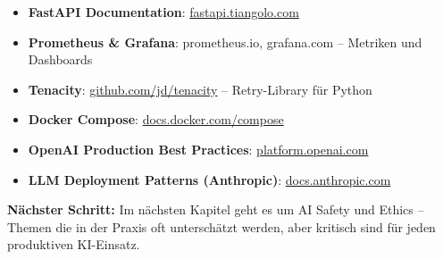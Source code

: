 \begin{itemize}[leftmargin=*]
    \item \textbf{FastAPI Documentation}: \href{https://fastapi.tiangolo.com}{fastapi.tiangolo.com}
    \item \textbf{Prometheus \& Grafana}: prometheus.io, grafana.com -- Metriken und Dashboards
    \item \textbf{Tenacity}: \href{https://github.com/jd/tenacity}{github.com/jd/tenacity} -- Retry-Library für Python
    \item \textbf{Docker Compose}: \href{https://docs.docker.com/compose/}{docs.docker.com/compose}
    \item \textbf{OpenAI Production Best Practices}: \href{https://platform.openai.com/docs/guides/production-best-practices}{platform.openai.com}
    \item \textbf{LLM Deployment Patterns (Anthropic)}: \href{https://docs.anthropic.com/en/docs/quickstart}{docs.anthropic.com}
\end{itemize}

\textbf{Nächster Schritt:} Im nächsten Kapitel geht es um AI Safety und Ethics -- Themen die in der Praxis oft unterschätzt werden, aber kritisch sind für jeden produktiven KI-Einsatz.
